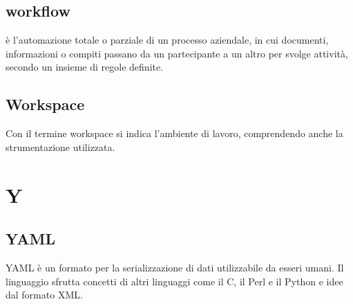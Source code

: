 \subsection{workflow}  è l’automazione totale o parziale di un processo aziendale, in cui documenti, informazioni o compiti passano da un partecipante a un altro per svolge attività, secondo un insieme di regole definite.
\subsection{Workspace}  Con il termine workspace si indica l'ambiente di lavoro, comprendendo anche la strumentazione utilizzata.

\newpage \section{Y}
\subsection{YAML}  YAML è un formato per la serializzazione di dati utilizzabile da esseri umani. Il linguaggio sfrutta concetti di altri linguaggi come il C, il Perl e il Python e idee dal formato XML.
